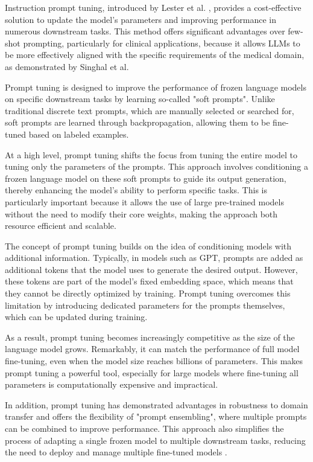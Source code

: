 Instruction prompt tuning, introduced by Lester et al. \cite{lester2021power}, provides a cost-effective solution to update the model's parameters and improving performance in numerous downstream tasks. This method offers significant advantages over few-shot prompting, particularly for clinical applications, because it allows LLMs to be more effectively aligned with the specific requirements of the medical domain, as demonstrated by Singhal et al. \cite{singhal2022large}

Prompt tuning is designed to improve the performance of frozen language models on specific downstream tasks by learning so-called "soft prompts". Unlike traditional discrete text prompts, which are manually selected or searched for, soft prompts are learned through backpropagation, allowing them to be fine-tuned based on labeled examples.

At a high level, prompt tuning shifts the focus from tuning the entire model to tuning only the parameters of the prompts. This approach involves conditioning a frozen language model on these soft prompts to guide its output generation, thereby enhancing the model's ability to perform specific tasks. This is particularly important because it allows the use of large pre-trained models without the need to modify their core weights, making the approach both resource efficient and scalable.

The concept of prompt tuning builds on the idea of conditioning models with additional information. Typically, in models such as GPT, prompts are added as additional tokens that the model uses to generate the desired output. However, these tokens are part of the model's fixed embedding space, which means that they cannot be directly optimized by training. Prompt tuning overcomes this limitation by introducing dedicated parameters for the prompts themselves, which can be updated during training.

As a result, prompt tuning becomes increasingly competitive as the size of the language model grows. Remarkably, it can match the performance of full model fine-tuning, even when the model size reaches billions of parameters. This makes prompt tuning a powerful tool, especially for large models where fine-tuning all parameters is computationally expensive and impractical.

In addition, prompt tuning has demonstrated advantages in robustness to domain transfer and offers the flexibility of "prompt ensembling", where multiple prompts can be combined to improve performance. This approach also simplifies the process of adapting a single frozen model to multiple downstream tasks, reducing the need to deploy and manage multiple fine-tuned models \cite{lester2021power}.

